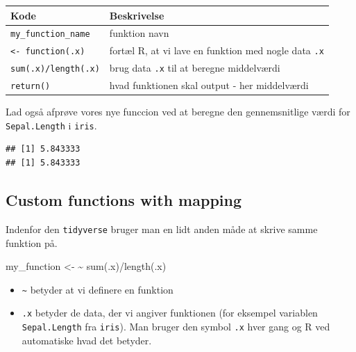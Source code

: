\documentclass[
]{book}
\newenvironment{Shaded}{\begin{snugshade}}{\end{snugshade}}
\newcommand{\ErrorTok}[1]{\textcolor[rgb]{0.64,0.00,0.00}{\textbf{#1}}}
\newcommand{\FunctionTok}[1]{\textcolor[rgb]{0.00,0.00,0.00}{#1}}
\newcommand{\NormalTok}[1]{#1}
\newcommand{\OtherTok}[1]{\textcolor[rgb]{0.56,0.35,0.01}{#1}}
\newcommand{\SpecialCharTok}[1]{\textcolor[rgb]{0.00,0.00,0.00}{#1}}
\providecommand{\tightlist}{%
  \setlength{\itemsep}{0pt}\setlength{\parskip}{0pt}}
\begin{document}
\begin{longtable}[]{@{}ll@{}}
\toprule
Kode & Beskrivelse \\
\midrule
\endhead
\texttt{my\_function\_name} & funktion navn \\
\texttt{\textless{}-\ function(.x)} & fortæl R, at vi lave en funktion med nogle data \texttt{.x} \\
\texttt{sum(.x)/length(.x)} & brug data \texttt{.x} til at beregne middelværdi \\
\texttt{return()} & hvad funktionen skal output - her middelværdi \\
\bottomrule
\end{longtable}

Lad også afprøve vores nye funccion ved at beregne den gennemsnitlige værdi for \texttt{Sepal.Length} i \texttt{iris}.

\begin{Shaded}
\end{Shaded}

\begin{verbatim}
## [1] 5.843333
## [1] 5.843333
\end{verbatim}

\hypertarget{custom-functions-with-mapping}{%
\subsection{Custom functions with mapping}\label{custom-functions-with-mapping}}

Indenfor den \texttt{tidyverse} bruger man en lidt anden måde at skrive samme funktion på.

\begin{Shaded}
\begin{Highlighting}[]
\NormalTok{my\_function }\OtherTok{\textless{}{-}} \ErrorTok{\textasciitilde{}} \FunctionTok{sum}\NormalTok{(.x)}\SpecialCharTok{/}\FunctionTok{length}\NormalTok{(.x)}
\end{Highlighting}
\end{Shaded}

\begin{itemize}
\tightlist
\item
  \texttt{\textasciitilde{}} betyder at vi definere en funktion
\item
  \texttt{.x} betyder de data, der vi angiver funktionen (for eksempel variablen \texttt{Sepal.Length} fra \texttt{iris}). Man bruger den symbol \texttt{.x} hver gang og R ved automatiske hvad det betyder.
\end{itemize}
\end{document}
